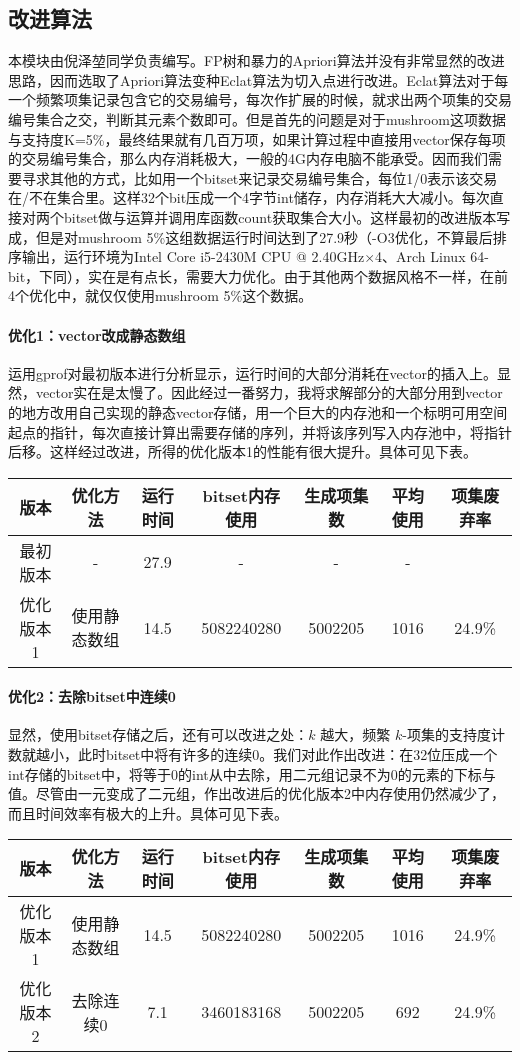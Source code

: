 \documentclass[a4paper,9pt]{article}
\begin{document}
\subsection{改进算法}
本模块由倪泽堃同学负责编写。FP树和暴力的Apriori算法并没有非常显然的改进思路，因而选取了Apriori算法变种Eclat算法为切入点进行改进。Eclat算法对于每一个频繁项集记录包含它的交易编号，每次作扩展的时候，就求出两个项集的交易编号集合之交，判断其元素个数即可。但是首先的问题是对于mushroom这项数据与支持度K=5\%，最终结果就有几百万项，如果计算过程中直接用vector保存每项的交易编号集合，那么内存消耗极大，一般的4G内存电脑不能承受。因而我们需要寻求其他的方式，比如用一个bitset来记录交易编号集合，每位1/0表示该交易在/不在集合里。这样32个bit压成一个4字节int储存，内存消耗大大减小。每次直接对两个bitset做与运算并调用库函数count获取集合大小。这样最初的改进版本写成，但是对mushroom 5\%这组数据运行时间达到了27.9秒（-O3优化，不算最后排序输出，运行环境为Intel Core i5-2430M CPU @ 2.40GHz$\times$4、Arch Linux 64-bit，下同），实在是有点长，需要大力优化。由于其他两个数据风格不一样，在前4个优化中，就仅仅使用mushroom 5\%这个数据。

\paragraph{优化1：vector改成静态数组}
运用gprof对最初版本进行分析显示，运行时间的大部分消耗在vector的插入上。显然，vector实在是太慢了。因此经过一番努力，我将求解部分的大部分用到vector的地方改用自己实现的静态vector存储，用一个巨大的内存池和一个标明可用空间起点的指针，每次直接计算出需要存储的序列，并将该序列写入内存池中，将指针后移。这样经过改进，所得的优化版本1的性能有很大提升。具体可见下表。
\begin{center}
	\begin{tabular}{ccccccc}
		版本&优化方法&运行时间&bitset内存使用&生成项集数&平均使用&项集废弃率\\\hline
		最初版本&-&27.9&-&-&-\\
		优化版本1&使用静态数组&14.5&5082240280&5002205&1016&24.9\%
	\end{tabular}
\end{center}

\paragraph{优化2：去除bitset中连续0}
显然，使用bitset存储之后，还有可以改进之处：$k$ 越大，频繁 $k$-项集的支持度计数就越小，此时bitset中将有许多的连续0。我们对此作出改进：在32位压成一个int存储的bitset中，将等于0的int从中去除，用二元组记录不为0的元素的下标与值。尽管由一元变成了二元组，作出改进后的优化版本2中内存使用仍然减少了，而且时间效率有极大的上升。具体可见下表。
\begin{center}
	\begin{tabular}{ccccccc}
		版本&优化方法&运行时间&bitset内存使用&生成项集数&平均使用&项集废弃率\\\hline
		优化版本1&使用静态数组&14.5&5082240280&5002205&1016&24.9\%\\
		优化版本2&去除连续0&7.1&3460183168&5002205&692&24.9\%
	\end{tabular}
\end{center}
\end{document}
